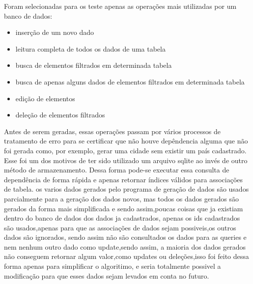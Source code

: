 \documentclass[
	12pt,				%
	openright,			%
	oneside,			%
	a4paper,			%
	english,			%
	french,				%
	spanish,			%
	brazil,				%
	]{abntex2}
\begin{document}
Foram selecionadas para os teste apenas as operações mais utilizadas por um banco de dados:
\begin{itemize}
\item inserção de um novo dado
\item leitura completa de todos os dados de uma tabela
\item busca de elementos filtrados em determinada tabela
\item busca de apenas alguns dados de elementos filtrados em determinada tabela
\item edição de elementos
\item deleção de elementos filtrados
\end{itemize}
Antes de serem geradas, essas operações passam por vários processos de tratamento de erro para se certificar que não houve depêndencia alguma que não foi gerada como,
por exemplo, gerar uma cidade sem existir um país cadastrado. Esse foi um dos motivos de ter sido utilizado um arquivo sqlite ao invés de outro método de armazenamento.
Dessa forma pode-se executar essa consulta de dependência de forma rápida e apenas retornar índices válidos para associações de tabela.
os varios dados gerados pelo programa de geração de dados são usados parcialmente para a geração dos dados novos,
mas todos os dados gerados são gerados da forma mais simplificada e sendo assim,poucas coisas que ja existiam dentro do banco de dados dos dados ja cadastrados,
apenas os ids cadastrados são usados,apenas para que as associações de dados sejam possiveis,os outros dados são ignorados,
sendo assim não são consultados os dados para as queries e nem nenhum outro dado como update,sendo assim,
a maioria dos dados gerados não conseguem retornar algum valor,como updates ou deleções,isso foi feito dessa forma apenas para simplificar o algoritimo,
e seria totalmente possivel a modificação para que esses dados sejam levados em conta no futuro.
\end{document}
